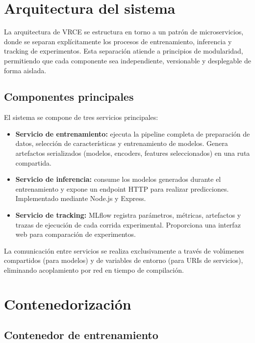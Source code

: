 \documentclass{ULBreport} %
\begin{document}
\section{Arquitectura del sistema}

La arquitectura de VRCE se estructura en torno a un patrón de microservicios, donde se separan explícitamente los procesos de entrenamiento, inferencia y tracking de experimentos. Esta separación atiende a principios de modularidad, permitiendo que cada componente sea independiente, versionable y desplegable de forma aislada.

\subsection{Componentes principales}

El sistema se compone de tres servicios principales:

\begin{itemize}
    \item \textbf{Servicio de entrenamiento:} ejecuta la pipeline completa de preparación de datos, selección de características y entrenamiento de modelos. Genera artefactos serializados (modelos, encoders, features seleccionados) en una ruta compartida.
    
    \item \textbf{Servicio de inferencia:} consume los modelos generados durante el entrenamiento y expone un endpoint HTTP para realizar predicciones. Implementado mediante Node.js y Express.
    
    \item \textbf{Servicio de tracking:} MLflow registra parámetros, métricas, artefactos y trazas de ejecución de cada corrida experimental. Proporciona una interfaz web para comparación de experimentos.
\end{itemize}

La comunicación entre servicios se realiza exclusivamente a través de volúmenes compartidos (para modelos) y de variables de entorno (para URIs de servicios), eliminando acoplamiento por red en tiempo de compilación.

\section{Contenedorización}

\subsection{Contenedor de entrenamiento}
\end{document}
